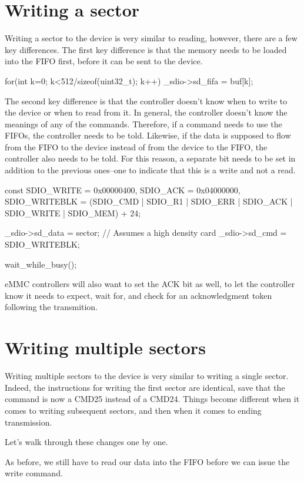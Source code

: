 \documentclass{gqtekspec}
\begin{document}
\section{Writing a sector}
Writing a sector to the device is very similar to reading, however, there
are a few key differences.  The first key difference is that the memory
needs to be loaded into the FIFO first, before it can be sent to the device.
\begin{zCpp}
	for(int k=0; k<512/sizeof(uint32_t); k++)
		_sdio->sd_fifa = buf[k];
\end{zCpp}

The second key difference is that the controller doesn't know when to write
to the device or when to read from it.  In general, the controller doesn't
know the meanings of any of the commands.  Therefore, if a command needs to
use the FIFOs, the controller needs to be told.  Likewise, if the data is
supposed to flow from the FIFO to the device instead of from the device to
the FIFO, the controller also needs to be told.  For this reason, a separate
bit needs to be set in addition to the previous ones--one to indicate that
this is a write and not a read.

\begin{zCpp}
	const	SDIO_WRITE    = 0x00000400,
		SDIO_ACK      = 0x04000000,
		SDIO_WRITEBLK = (SDIO_CMD | SDIO_R1 | SDIO_ERR
				| SDIO_ACK | SDIO_WRITE | SDIO_MEM) + 24;

	_sdio->sd_data = sector;	// Assumes a high density card
	_sdio->sd_cmd  = SDIO_WRITEBLK;

	wait_while_busy();
\end{zCpp}

eMMC controllers will also want to set the ACK bit as well, to let the
controller know it needs to expect, wait for, and check for an acknowledgment
token following the transmition.
\section{Writing multiple sectors}
Writing multiple sectors to the device is very similar to writing a single
sector.  Indeed, the instructions for writing the first sector are identical,
save that the command is now a CMD25 instead of a CMD24.  Things become
different when it comes to writing subsequent sectors, and then when it comes
to ending transmission.

Let's walk through these changes one by one.

As before, we still have to read our data into the FIFO before we can issue
the write command.
\end{document}
